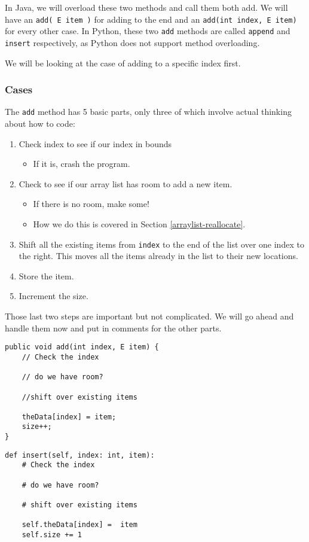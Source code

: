 In Java, we will overload these two methods and call them both add.  We will have an \texttt{add( E item )} for adding to the end and an \texttt{add(int index, E item)} for every other case.  
In Python, these two \texttt{add} methods are called \texttt{append} and \texttt{insert} respectively, as Python does not support method overloading.

We will be looking at the case of adding to a specific index first.


\subsubsection{Cases}
The \texttt{add} method has 5 basic parts, only three of which involve actual thinking about how to code:
\begin{enumerate}
	\item Check index to see if our index in bounds
	\begin{itemize}
		\item If it is, crash the program.
	\end{itemize}
	\item Check to see if our array list has room to add a new item.
	\begin{itemize}
		\item If there is no room, make some!
		\item How we do this is covered in Section \ref{arraylist-reallocate}.
	\end{itemize}
	\item Shift all the existing items from \texttt{index} to the end of the list over one index to the right.  This moves all the items already in the list to their new locations.
	\item Store the item.
	\item Increment the size.
\end{enumerate}

Those last two steps are important but not complicated. We will go ahead and handle them now and put in comments for the other parts.

\begin{verbatim}
public void add(int index, E item) {
	// Check the index
	
	// do we have room?
	
	//shift over existing items

	theData[index] = item;
	size++;
}
\end{verbatim}

\begin{verbatim}
def insert(self, index: int, item):
	# Check the index
	
	# do we have room?
	
	# shift over existing items

	self.theData[index] =  item
	self.size += 1

\end{verbatim}


